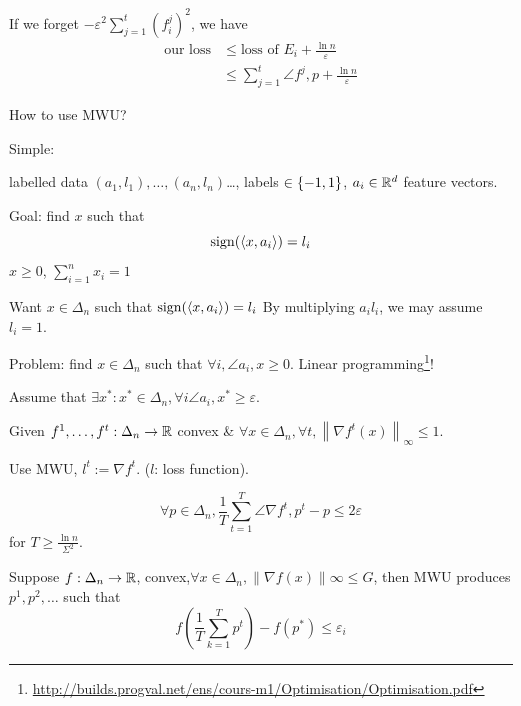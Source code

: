 If we forget $- \varepsilon^2 \sum\limits_{j=1}^t (f_i^j)^2$, we have
\[
    \begin{aligned}
        \text{our loss} &\leqslant \text{loss of }E_i + \frac{\ln n}{\varepsilon}\\
        &\leqslant\sum\limits_{j=1}^t \angle{f^j, p} + \frac{\ln n}{\varepsilon}
    \end{aligned}
\]

How to use MWU? 

Simple:

labelled data $(a_1,l_1), \ldots ,(a_n,l_n)$\dots, labels $\in \left\{ -1,1 \right\}$, $a_i \in \mathbb{R}^d$ feature vectors.

Goal: find $x$ such that
\[
    \operatorname{sign}(\left\langle x, a_i \right\rangle) = l_i
\]
$x \geqslant 0$, $\sum\limits_{i=1}^n x_i = 1$

Want $x \in \Delta_n$ such that $\operatorname{sign}(\left\langle x, a_i \right\rangle) = l_i$ By multiplying $a_i l_i$, we may assume $l_i = 1$.

Problem: find $x\in\Delta_n$ such that $\forall i, \angle{a_i,x} \geqslant 0$. Linear programming\footnote{\url{http://builds.progval.net/ens/cours-m1/Optimisation/Optimisation.pdf}}!

Assume that $\exists x^* : x^* \in \Delta_n, \forall i \angle{a_i, x^*} \geqslant \varepsilon$.

Given $f^1, \ldots, f^t : \Delta_n \to \mathbb{R}$ convex \& $\forall x \in \Delta_n,\forall t,\left\lVert\nabla f^t(x)\right\rVert_\infty \leqslant 1$.

Use MWU, $l^t := \nabla f^t$. ($l$: loss function).

\begin{corollary}
    \[
        \forall p \in\Delta_n, \frac{1}{T} \sum\limits_{t=1}^T \angle{\nabla f^t, p^t-p} \leqslant 2 \varepsilon
    \]
    for $T \geqslant \frac{\ln n}{\Sigma^2}$.
\end{corollary}

\begin{corollary}
    Suppose $f:\Delta_n \to \mathbb{R}$, convex,$\forall x \in \Delta_n, \lVert \nabla f(x) \rVert\infty \leqslant G$, then MWU produces $p^1,p^2,\ldots$ such that
    \[
        f\left( \frac{1}{T}\sum\limits_{k=1}^T  p^t\right) - f(p^*) \leqslant \varepsilon_i
    \]
\end{corollary}